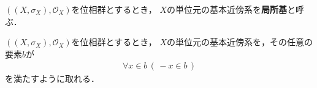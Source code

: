 	\begin{screen}
		\begin{dfn}[局所基]
			$\left(\left(X,\sigma_X\right),\mathscr{O}_X\right)$を位相群とするとき，
			$X$の単位元の基本近傍系を{\bf 局所基}と呼ぶ．
		\end{dfn}
	\end{screen}
	
	\begin{screen}
		\begin{thm}[すべての要素が逆元で閉じている局所基が取れる]
		\label{thm:there_exists_a_local_base_whose_elements_are_closed_under_inversion}
			$\left(\left(X,\sigma_X\right),\mathscr{O}_X\right)$を位相群とするとき，
			$X$の単位元の基本近傍系を，その任意の要素$b$が
			\begin{align}
				\forall x \in b\, (\, -x \in b\, )
				\label{fom:thm_there_exists_a_local_base_whose_elements_are_closed_under_inversion}
			\end{align}
			を満たすように取れる．
		\end{thm}
	\end{screen}
	
